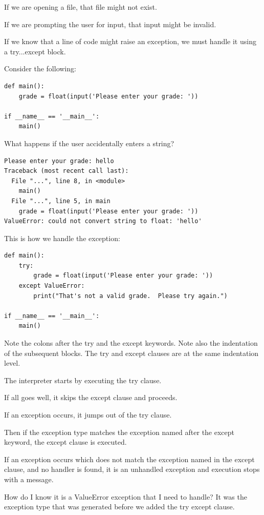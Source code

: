 \documentclass{article}
\begin{document}
If we are opening a file, that file might not exist. 

If we are prompting the user for input, that input might be invalid.

If we know that a line of code might raise an exception, we must handle it using a try...except block.

Consider the following:

\begin{lstlisting}
def main():
    grade = float(input('Please enter your grade: '))
 
if __name__ == '__main__':
    main()
\end{lstlisting}

What happens if the user accidentally enters a string? 

\begin{lstlisting}
Please enter your grade: hello
Traceback (most recent call last):
  File "...", line 8, in <module>
    main()
  File "...", line 5, in main
    grade = float(input('Please enter your grade: ')) 
ValueError: could not convert string to float: 'hello'
\end{lstlisting}

This is how we handle the exception:

\begin{lstlisting}
def main():
    try:
        grade = float(input('Please enter your grade: '))
    except ValueError:
        print("That's not a valid grade.  Please try again.")
 
if __name__ == '__main__':
    main()
\end{lstlisting}

Note the colons after the try and the except keywords.  Note also the indentation of the subsequent blocks.  The try and except clauses are at the same indentation level.

The interpreter starts by executing the try clause. 

If all goes well, it skips the except clause and proceeds. 

If an exception occurs, it jumps out of the try clause.

Then if the exception type matches the exception named after the except keyword, the except clause is executed.

If an exception occurs which does not match the exception named in the except clause, and no handler is found, it is an unhandled exception and execution stops with a message.

How do I know it is a ValueError exception that I need to handle?  It was the exception type that was generated before we added the try except clause.
\end{document}
